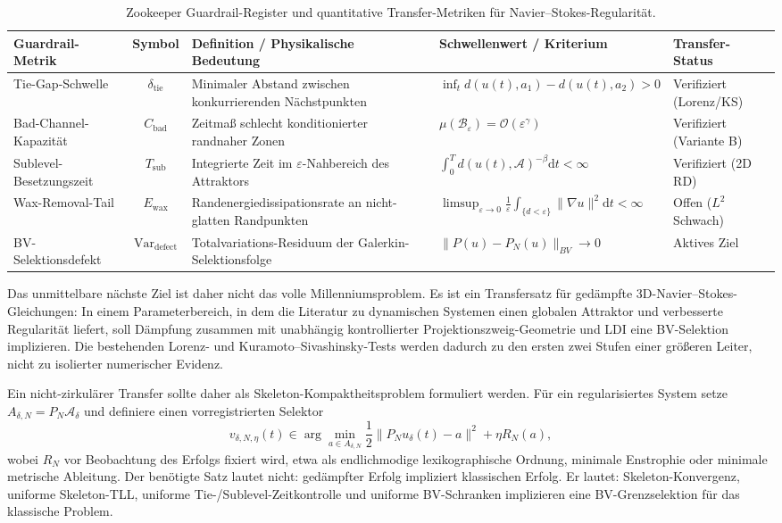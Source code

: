 \documentclass[12pt,a4paper]{article}
\theoremstyle{definition}
\theoremstyle{plain}
\theoremstyle{remark}
\begin{document}
\begin{table}[htbp]
\centering
\caption{Zookeeper Guardrail-Register und quantitative Transfer-Metriken für Navier--Stokes-Regularität.}
\label{tab:zookeeper_guardrails}
\vspace{0.2cm}
\footnotesize
\begin{tabularx}{\textwidth}{>{\raggedright\arraybackslash}p{2.5cm} c X >{\raggedright\arraybackslash}p{5.4cm} >{\raggedright\arraybackslash}p{1.8cm}}
\toprule
\textbf{Guardrail-Metrik} & \textbf{Symbol} & \textbf{Definition / Physikalische Bedeutung} & \textbf{Schwellenwert / Kriterium} & \textbf{Transfer-Status} \\
\midrule
Tie-Gap-Schwelle & $\delta_{\text{tie}}$ & Minimaler Abstand zwischen konkurrierenden Nächstpunkten & $\inf_{t} d(u(t), a_1) - d(u(t), a_2) > 0$ & Verifiziert (Lorenz/KS) \\
Bad-Channel-Kapazität & $C_{\text{bad}}$ & Zeitmaß schlecht konditionierter randnaher Zonen & $\mu(\mathcal{B}_\varepsilon) = \mathcal{O}(\varepsilon^\gamma)$ & Verifiziert (Variante B) \\
Sublevel-Besetzungszeit & $T_{\text{sub}}$ & Integrierte Zeit im $\varepsilon$-Nahbereich des Attraktors & $\int_0^T d(u(t),\mathcal{A})^{-\beta} \mathrm{d}t < \infty$ & Verifiziert (2D RD) \\
Wax-Removal-Tail & $E_{\text{wax}}$ & Randenergiedissipationsrate an nicht-glatten Randpunkten & $\limsup_{\varepsilon\to 0} \frac{1}{\varepsilon}\int_{\{d<\varepsilon\}} \|\nabla u\|^2 \mathrm{d}t < \infty$ & Offen ($L^2$ Schwach) \\
BV-Selektionsdefekt & $\text{Var}_{\text{defect}}$ & Totalvariations-Residuum der Galerkin-Selektionsfolge & $\|P(u) - P_N(u)\|_{BV} \to 0$ & Aktives Ziel \\
\bottomrule
\end{tabularx}
\end{table}

Das unmittelbare nächste Ziel ist daher nicht das volle
Millenniumsproblem.  Es ist ein Transfersatz für gedämpfte
3D-Navier--Stokes-Gleichungen: In einem Parameterbereich, in dem die
Literatur zu dynamischen Systemen einen globalen Attraktor und verbesserte
Regularität liefert, soll Dämpfung zusammen mit unabhängig
kontrollierter Projektionszweig-Geometrie und LDI eine BV-Selektion
implizieren.  Die bestehenden Lorenz- und Kuramoto--Sivashinsky-Tests
werden dadurch zu den ersten zwei Stufen einer größeren Leiter, nicht zu
isolierter numerischer Evidenz.

Ein nicht-zirkulärer Transfer sollte daher als
Skeleton-Kompaktheitsproblem formuliert werden. Für ein regularisiertes
System setze \(A_{\delta,N}=P_N\mathcal{A}_\delta\) und definiere einen
vorregistrierten Selektor
\[
v_{\delta,N,\eta}(t)\in\arg\min_{a\in A_{\delta,N}}
\frac12\|P_Nu_\delta(t)-a\|^2+\eta R_N(a),
\]
wobei \(R_N\) vor Beobachtung des Erfolgs fixiert wird, etwa als
endlichmodige lexikographische Ordnung, minimale Enstrophie oder
minimale metrische Ableitung. Der benötigte Satz lautet nicht:
gedämpfter Erfolg impliziert klassischen Erfolg. Er lautet:
Skeleton-Konvergenz, uniforme Skeleton-TLL, uniforme
Tie-/Sublevel-Zeitkontrolle und uniforme BV-Schranken implizieren eine
BV-Grenzselektion für das klassische Problem.
\end{document}
